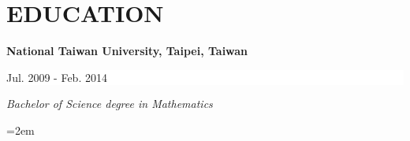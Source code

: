 \documentclass[a4paper, 11pt]{article}
\newcommand{\NewPart}[1]{\section*{\uppercase{#1}}}
\newcommand{\EducationEntry}[4]{
		\noindent \textbf{#1} \hfill      %
		\colorbox{White}{%
			\parbox{5cm}{%
			\hfill\color{Black}#2}} \par  %
		\noindent \textit{#3} \par        %
		\noindent\hangindent=2em\hangafter=0 \small #4 %
		\normalsize \par}
\newcommand{\PrjEntry}[4]{				  %
		\noindent \textbf{#1} \hfill      %
		\noindent\colorbox{Black}{\color{White}#2} \par  %
		\noindent \textit{#3} \par              %
		\noindent\hangindent=2em\hangafter=0 \small #4 %
		\normalsize \par}
\begin{document}
\NewPart{Education}{}

\EducationEntry{National Taiwan University, Taipei, Taiwan}{Jul. 2009 - Feb. 2014}
{Bachelor of Science degree in Mathematics}{}


\end{document}
